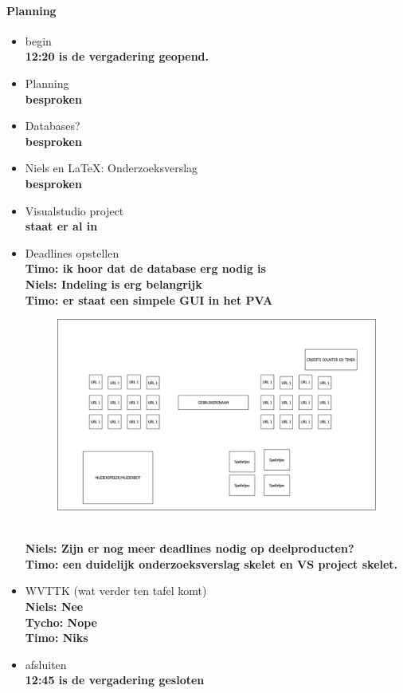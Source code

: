 \documentclass[11pt]{article}
\begin{document}
\paragraph{Planning}
\begin{itemize}
	\item begin \\ 
	\textbf{12:20 is de vergadering geopend.}
	\item Planning \\
	\textbf{ besproken}
	\item Databases? \\
	\textbf{ besproken}
	\item Niels en \LaTeX : Onderzoeksverslag \\ 
	\textbf{besproken}
	\item Visualstudio project \\ 
	\textbf{staat er al in} 
	\item Deadlines opstellen \\
	\textbf{Timo: ik hoor dat de database erg nodig is\\
	Niels: Indeling is erg belangrijk\\
Timo: er staat een simpele GUI in het PVA} \\
\begin{figure}[h]
\centering
\includegraphics[width=\textwidth]{GUI}	
\end{figure}\\
\textbf{Niels: Zijn er nog meer deadlines nodig op deelproducten?\\
Timo: een duidelijk onderzoeksverslag skelet en VS project skelet.\\}
\newpage
	\item WVTTK (wat verder ten tafel komt)\\
		\textbf{Niels: Nee\\
		Tycho: Nope\\
		Timo: Niks}
	\item afsluiten\\
	\textbf{12:45 is de vergadering gesloten}\\
	
\end{itemize}
\end{document}
